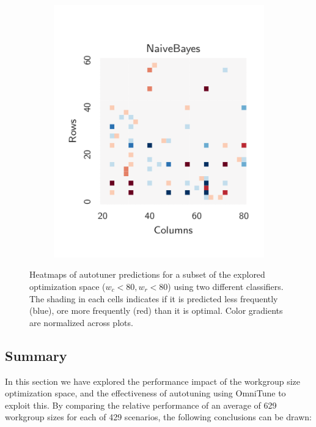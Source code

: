 \documentclass[nonatbib,preprint,nocopyrightspace,9pt]{sigplanconf}
\begin{document}
\begin{figure}
\begin{subfigure}[t]{0.48\columnwidth}
\includegraphics[width=\columnwidth]{img/heatmap_2}
\vspace{-1.5em} %
\caption{}
\label{fig:class-hmaps-2}
\end{subfigure}
\vspace{-.5em}
\caption{%
  Heatmaps of autotuner predictions for a subset of the explored optimization
  space ($w_c < 80, w_r < 80$) using two different classifiers. The shading in
  each cells indicates if it is predicted less frequently (blue), ore more
  frequently (red) than it is optimal. Color gradients are normalized across
  plots.
  \vspace{-1.5em}%
}
\label{fig:class-hmaps}
\end{figure}


\subsection{Summary}

In this section we have explored the performance impact of the workgroup size
optimization space, and the effectiveness of autotuning using OmniTune to
exploit this. By comparing the relative performance of an average of 629
workgroup sizes for each of 429 scenarios, the following conclusions can be
drawn:
\end{document}
